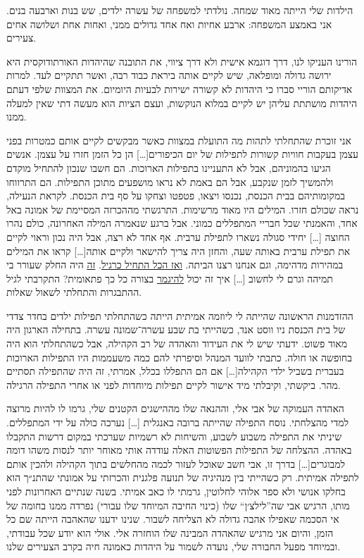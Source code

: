 \documentclass[14pt, article, extrafontsizes, twopage, a4paper]{memoir}
\begin{document}
הילדות שלי הייתה מאוד שמחה. נולדתי למשפחה של עשרה ילדים, שש בנות וארבעה בנים. אני באמצע המשפחה: ארבע אחיות ואח אחד גדולים ממני, ואחות אחת ושלושה אחים צעירים.

הורינו העניקו לנו, דרך דוגמא אישית ולא דרך ציווי, את התובנה שהיהדות האורתודוקסית היא ירושה גדולה ומופלאה, שיש לקיים אותה ביראת כבוד רבה, ואשר תתקיים לעד. למרות אדיקותם הוריי סברו כי היהדות לא קשורה ישירות לבעיות היומיום. את המצוות שלפי דעתם היהדות מושתתת עליהן יש לקיים במלוא הנוקשות, ועצם הציות הוא מעשה דתי שאין למעלה ממנו.

אני זוכרת שהתחלתי לתהות מה התועלת במצוות כאשר מבקשים לקיים אותם כמטרות בפני עצמן בעקבות חוויות קשורות לתפילות של יום הכיפורים[…] הן כל הזמן חזרו על עצמן. אנשים הגיעו בהמוניהם, אבל לא התעניינו בתפילות הארוכות. הם חשבו שנכון להתחיל מוקדם ולהמשיך לזמן שנקבע, אבל הם באמת לא נראו מושפעים מתוכן התפילות. הם התרווחו במקומותיהם בבית הכנסת, נכנסו ויצאו, פטפטו וצחקו על סף בית הכנסת. לקראת הנעילה, נראה שכולם חזרו. המילים היו מאוד מרשימות. התרגשתי מההכרזה המסיימת של אמונה באל אחד, והאמנתי שכל חבריי המתפללים כמוני.
אבל ברגע שנאמרה המילה האחרונה, כולם נהרו החוצה […] יחידי סגולה נשארו לתפילת ערבית. אף אחד לא רצה, אבל היה נכון וראוי לקיים את תפילת ערבית באותה שעה, והחזן היה צריך להישאר ולקיים אותה[…] קראו את המילים במהירות מדהימה, וגם אנחנו רצנו הביתה. \underline{ואז הכל התחיל כרגיל}. \underline{זה} היה החלק שעורר בי תמיהה וגרם לי לחשוב […] איך זה יכול \underline{להיגמר} בצורה כל כך פתאומית? התקרבתי לגיל ההתבגרות והתחלתי לשאול שאלות.

ההזדמנות הראשונה שהייתה לי ליוזמה אמיתית הייתה כשהתחלתי תפילות ילדים בחדר צדדי של בית הכנסת ניו ווסט אנד, כשהייתי בת שבע עשרה־שמונה עשרה. בתחילה הארגון היה מאוד פשוט. ידעתי שיש לי את העידוד והאהדה של רב הקהילה, אבל כשהתחלתי הוא היה בחופשה או חולה. כתבתי לוועד המנהל וסיפרתי להם כמה משעממות היו התפילות הארוכות בעברית בשביל ילדי הקהילה[…] אם הם התפללו בכלל, אמרתי, זה היה שהתפילה תסתיים מהר. ביקשתי, וקיבלתי מיד אישור לקיים תפילות מיוחדות לפני או אחרי התפילה הרגילה.

האהדה העמוקה של אבי אלי, וההנאה שלו מההישגים הקטנים שלי, גרמו לו להיות מרוצה למדי מהצלחתי. נוסח התפילה שהייתה ברובה באנגלית […] נערכה כולה על ידי המתפללים. שיניתי את התפילה משבוע לשבוע, והשיחות לא רשמיות שערכתי במקום דרשות התקבלו באהדה. ההצלחה של התפילות הפשוטות האלה עודדה אותי מאוחר יותר לנסות משהו דומה למבוגרים[…] בדרך זו, אבי חשב שאוכל לעזור לכמה מהחלשים בתוך הקהילה ולהכין אותם לתפילה אמיתית. רק כשהייתי בין מנהיגיה של תנועה פלגנית והכרזתי על אמונתי שהתנ״ך הוא בחלקו אנושי ולא ספר אלוהי לחלוטין, גרמתי לו כאב אמיתי. בשנה שנתיים האחרונות לפני מותו, הרגיש אבי שה”לילצ׳ן“ שלו (כינוי החיבה המיוחד שלו עבורי) נפרדה ממנו בחומה של אי הסכמה שאפילו אהבה גדולה לא הצליחה לשבור. שנינו ידענו שהאהבה הייתה שם כל הזמן, והיום אני מרגיש שהאהדה המבינה שלו הוחזרה אלי. אולי הוא יודע שכל עבודתי, ובמיוחד מפעל החבורה שלי, נועדה לשמור על היהדות כאמונה חיה בקרב הצעירים שלנו.
\end{document}
